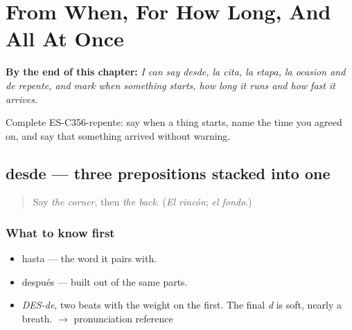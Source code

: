 
\chapter{From When, For How Long, And All At Once}
\label{ch:desde-y-de-repente}

\begin{chapteropening}
\textbf{By the end of this chapter:} \emph{I can say desde, la cita, la etapa, la ocasion and de repente, and mark when something starts, how long it runs and how fast it arrives.}

Complete ES-C356-repente: say when a thing starts, name the time you agreed on, and say that something arrived without warning.
\end{chapteropening}

\section[desde]{desde — three prepositions stacked into one}

\label{lesson:ES-C356-desde}



\begin{quote}
Say \emph{the corner}, then \emph{the back}. (\emph{El rincón}; \emph{el fondo}.)
\end{quote}

\subsection*{What to know first}
\begin{itemize}
\raggedright
  \item hasta — the word it pairs with.
  \item después — built out of the same parts.
\end{itemize}

\begin{sounds}
\begin{itemize}
\raggedright
  \item \emph{DES-de}, two beats with the weight on the first. The final \emph{d} is soft, nearly a breath. $\to$ pronunciation reference
\end{itemize}
\end{sounds}

